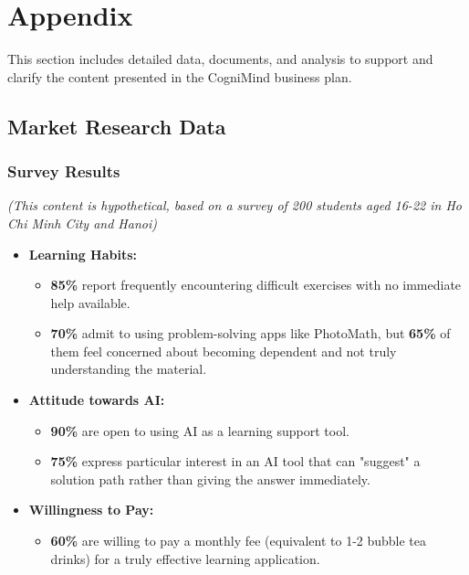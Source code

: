 \section{Appendix}
This section includes detailed data, documents, and analysis to support and clarify the content presented in the CogniMind business plan.

\subsection{Market Research Data}

\subsubsection{Survey Results}
\textit{(This content is hypothetical, based on a survey of 200 students aged 16-22 in Ho Chi Minh City and Hanoi)}
\begin{itemize}
    \item \textbf{Learning Habits:}
    \begin{itemize}
        \item \textbf{85\%} report frequently encountering difficult exercises with no immediate help available.
        \item \textbf{70\%} admit to using problem-solving apps like PhotoMath, but \textbf{65\%} of them feel concerned about becoming dependent and not truly understanding the material.
    \end{itemize}
    \item \textbf{Attitude towards AI:}
    \begin{itemize}
        \item \textbf{90\%} are open to using AI as a learning support tool.
        \item \textbf{75\%} express particular interest in an AI tool that can "suggest" a solution path rather than giving the answer immediately.
    \end{itemize}
    \item \textbf{Willingness to Pay:}
    \begin{itemize}
        \item \textbf{60\%} are willing to pay a monthly fee (equivalent to 1-2 bubble tea drinks) for a truly effective learning application.
    \end{itemize}
\end{itemize}

